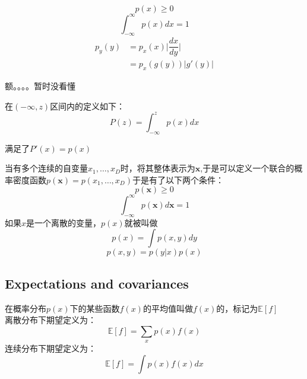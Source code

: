 \documentclass[cyan]{YuNote}
\begin{document}
\begin{equation}[1.]
p(x) \geqslant 0
\end{equation}
\begin{equation}[2.]
\int_{-\infty}^{\infty}p(x)dx=1
\end{equation}
\begin{equation}
\begin{split}
p_y(y)&=p_x(x)\vert\dfrac{dx}{dy}\vert\\&=p_x(g(y))\vert g'(y)\vert
\end{split}
\end{equation}
\begin{note}
额。。。。暂时没看懂
\end{note}
在$(-\infty,z)$区间内的定义如下：\\
\begin{equation}
P(z)=\int_{-\infty}^zp(x)dx
\end{equation}
\begin{note}
满足了$P'(x)=p(x)$
\end{note}
当有多个连续的自变量$x_1,\ldots,x_D$时，将其整体表示为$\mathbf{x}$,于是可以定义一个联合的概率密度函数$p(\mathbf{x})=p(x_1,\ldots,x_D)$于是有了以下两个条件：\\
\begin{equation}[1.]
p(\mathbf{x}) \geqslant 0
\end{equation}
\begin{equation}[2.]
\int_{-\infty}^{\infty}p(\mathbf{x})d\mathbf{x}=1
\end{equation}
如果$x$是一个离散的变量，$p(x)$就被叫做\\
\begin{equation}
p(x)=\int p(x,y)dy
\end{equation}
\begin{equation}
p(x,y)=p(y|x)p(x)
\end{equation}

\subsection{Expectations and covariances}
在概率分布$p(x)$下的某些函数$f(x)$的平均值叫做$f(x)$的，标记为$\mathbb{E }[f]$\\
离散分布下期望定义为：
\begin{equation}[离散分布期望定义]
\mathbb{E}[f]=\sum_xp(x)f(x)
\end{equation}
连续分布下期望定义为：
\begin{equation}[连续分布期望定义]
\mathbb{E}[f]=\int p(x)f(x)dx
\end{equation}
\end{document}
